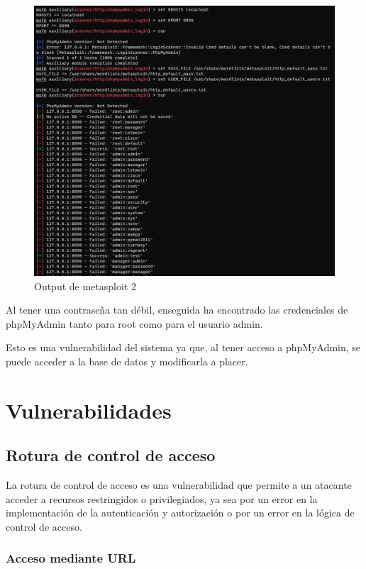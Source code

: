 \documentclass{report}
\begin{document}
            \begin{figure}[H]
                \centering
                \includegraphics[width=\textwidth]{./img/audit1/msf2.png}
                \caption{Output de metasploit 2}
            \end{figure}
            Al tener una contraseña tan débil, enseguida ha encontrado las credenciales de phpMyAdmin tanto para root como para el usuario admin.
            
            Esto es una vulnerabilidad del sistema ya que, al tener acceso a phpMyAdmin, se puede acceder a la base de datos y modificarla a placer.
        \clearpage
    \chapter{Vulnerabilidades}
        \section{Rotura de control de acceso}
            La rotura de control de acceso es una vulnerabilidad que permite a un atacante acceder a recursos restringidos o privilegiados, ya sea por un error en la implementación de la autenticación y autorización o por un error en la lógica de control de acceso.
            \subsection{Acceso mediante URL}
\end{document}
